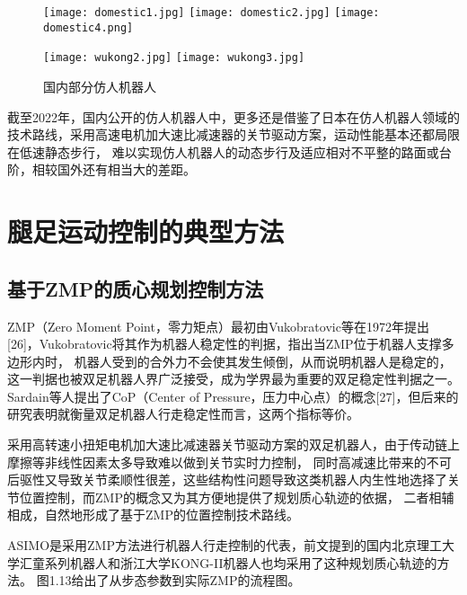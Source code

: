 \begin{figure}[htbp]
    \centering
        {%
            \texttt{[image: domestic1.jpg]}}
        {%
            \texttt{[image: domestic2.jpg]}}
        {%
            \texttt{[image: domestic4.png]}}     
    
        {%
            \texttt{[image: wukong2.jpg]}}
        {%
            \texttt{[image: wukong3.jpg]}}            
    \caption{国内部分仿人机器人\label{fig:domes_biped}}
\end{figure}
截至2022年，国内公开的仿人机器人中，更多还是借鉴了日本在仿人机器人领域的技术路线，采用高速电机加大速比减速器的关节驱动方案，运动性能基本还都局限在低速静态步行，
难以实现仿人机器人的动态步行及适应相对不平整的路面或台阶，相较国外还有相当大的差距。
\section{腿足运动控制的典型方法}
\subsection{基于ZMP的质心规划控制方法}
ZMP（Zero Moment Point，零力矩点）最初由Vukobratovic等在1972年提出[26]，Vukobratovic将其作为机器人稳定性的判据，指出当ZMP位于机器人支撑多边形内时，
机器人受到的合外力不会使其发生倾倒，从而说明机器人是稳定的，这一判据也被双足机器人界广泛接受，成为学界最为重要的双足稳定性判据之一。
Sardain等人提出了CoP（Center of Pressure，压力中心点）的概念[27]，但后来的研究表明就衡量双足机器人行走稳定性而言，这两个指标等价。

采用高转速小扭矩电机加大速比减速器关节驱动方案的双足机器人，由于传动链上摩擦等非线性因素太多导致难以做到关节实时力控制，
同时高减速比带来的不可后驱性又导致关节柔顺性很差，这些结构性问题导致这类机器人内生性地选择了关节位置控制，而ZMP的概念又为其方便地提供了规划质心轨迹的依据，
二者相辅相成，自然地形成了基于ZMP的位置控制技术路线。

ASIMO是采用ZMP方法进行机器人行走控制的代表，前文提到的国内北京理工大学汇童系列机器人和浙江大学KONG-II机器人也均采用了这种规划质心轨迹的方法。
图1.13给出了从步态参数到实际ZMP的流程图。

